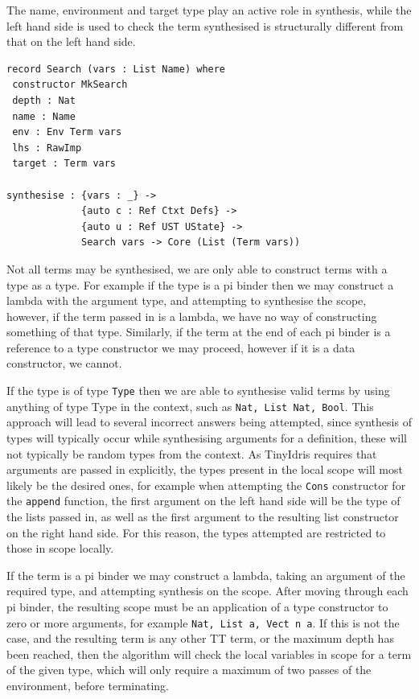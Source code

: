 \documentclass[a4paper]{article}
\begin{document}
The name, environment and target type play an active role in synthesis, while the left hand side is used to check the term 
synthesised is structurally different from that on the left hand side. 

\begin{center}
\begin{verbatim}
record Search (vars : List Name) where
 constructor MkSearch
 depth : Nat
 name : Name
 env : Env Term vars
 lhs : RawImp
 target : Term vars 

synthesise : {vars : _} -> 
			 {auto c : Ref Ctxt Defs} -> 
			 {auto u : Ref UST UState} ->
			 Search vars -> Core (List (Term vars))

\end{verbatim}
\end{center}


Not all terms may be synthesised, we are only able to construct terms with a type as a type. For example if the type is a pi binder then we
may construct a lambda with the argument type, and attempting to
synthesise the scope, however, if the term passed in is a lambda, we
have no way of constructing something of that type. Similarly, if the
term at the end of each pi binder is a reference to a type constructor
we may proceed, however if it is a data constructor, we cannot. 

If the type is of type \texttt{Type} then we are able to synthesise
valid terms by using anything of type Type in the context, such as
\texttt{Nat, List Nat, Bool}. This approach will lead to several
incorrect answers being attempted, since synthesis of types will
typically occur while synthesising arguments for a definition, these
will not typically be random types from the context. As TinyIdris
requires that arguments are passed in explicitly, the types present in
the local scope will most likely be the desired ones, for example
when attempting the \texttt{Cons} constructor for the \texttt{append}
function, the first argument on the left hand side will be the type
of the lists passed in, as well as the first argument to the resulting
list constructor on the right hand side. For this reason, the types
attempted are restricted to those in scope locally.

If the term is a pi binder we may construct a lambda, taking an
argument of the required type, and attempting synthesis on the scope. After moving through each pi binder, the resulting scope must be an application of a type constructor to zero or more
arguments, for example \texttt{Nat, List a, Vect n a}. If this is not the case, and the resulting term is any other TT term, or the maximum depth has been reached, then the algorithm will check the local 
variables in scope for a term of the given type, which will only require a maximum of two passes of the environment,
before terminating. 
\end{document}
